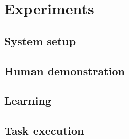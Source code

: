 \section{Experiments}

\subsection{System setup}

\subsection{Human demonstration}

\subsection{Learning}

\subsection{Task execution}
